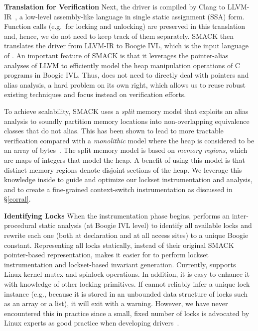 \noindent\textbf{Translation for Verification }
%
Next, the driver is compiled by Clang to LLVM-IR~\cite{lattner2004llvm}, a low-level assembly-like language in single static assignment (SSA) form. Function calls (e.g.\ for locking and unlocking) are preserved in this translation and, hence, we do not need to keep track of them separately.
%
SMACK then translates the driver from LLVM-IR to Boogie IVL, which is the input language of \whoop. An important feature of SMACK is that it leverages the pointer-alias analyses of LLVM to efficiently model the heap manipulation operations of C programs in Boogie IVL. Thus, \whoop does not need to directly deal with pointers and alias analysis, a hard problem on its own right, which allows us to reuse robust existing techniques and focus instead on verification efforts.

To achieve scalability, SMACK uses a \emph{split} memory model that exploits an alias analysis to soundly partition memory locations into non-overlapping equivalence classes that do not alias. This has been shown to lead to more tractable verification compared with a \emph{monolithic} model where the heap is considered to be an array of bytes~\cite{rakamaric2009scalable}. The split memory model is based on \emph{memory regions}, which are maps of integers that model the heap. A benefit of using this model is that distinct memory regions denote disjoint sections of the heap. We leverage this knowledge inside \whoop to guide and optimize our lockset instrumentation and analysis, and to create a fine-grained context-switch instrumentation as discussed in \S\ref{corral}.

\noindent\textbf{Identifying Locks }
%
When the instrumentation phase begins, \whoop performs an inter-procedural static analysis (at Boogie IVL level) to identify all available locks and rewrite each one (both at declaration and at all access sites) to a unique Boogie constant. Representing all locks statically, instead of their original SMACK pointer-based representation, makes it easier for \whoop to perform lockset instrumentation and lockset-based invariant generation.
%
Currently, \whoop supports Linux kernel mutex and spinlock operations.  In addition, it is easy to enhance it with knowledge of other locking primitives.
%
If \whoop cannot reliably infer a unique lock instance (e.g., because it is stored in an unbounded data structure of locks such as an array or a list), it will exit with a warning. However, we have never encountered this in practice since a small, fixed number of locks is advocated by Linux experts as good practice when developing drivers~\cite[p.\ 123]{corbet2005linux}.

